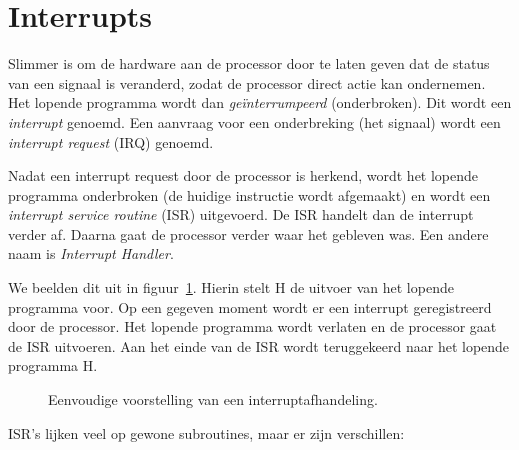 \section{Interrupts}
Slimmer is om de hardware aan de processor door te laten geven dat de status
van een signaal is veranderd, zodat de processor direct actie kan ondernemen.
Het lopende programma wordt dan \textsl{geïnterrumpeerd} (onderbroken).
Dit wordt een \textsl{interrupt} genoemd. Een aanvraag voor een onderbreking
(het signaal) wordt een \textsl{interrupt request} (IRQ) genoemd.

Nadat een interrupt request door de processor is herkend, wordt het lopende
programma onderbroken (de huidige instructie wordt afgemaakt) en wordt een
\textsl{interrupt service routine} (ISR) uitgevoerd. De ISR handelt dan de
interrupt verder af. Daarna gaat de processor verder waar het gebleven was.
Een andere naam is \textsl{Interrupt Handler}.

We beelden dit uit in figuur~\ref{fig:intsimpleinterruptdispatch}. Hierin
stelt \textsf{H} de uitvoer van het lopende programma voor. Op een gegeven
moment wordt er een interrupt geregistreerd door de processor. Het lopende
programma wordt verlaten en de processor gaat de ISR uitvoeren. Aan het einde
van de ISR wordt teruggekeerd naar het lopende programma \textsf{H}.


\begin{figure}[!ht]
\centering
{}
\caption{Eenvoudige voorstelling van een interruptafhandeling.}
\label{fig:intsimpleinterruptdispatch}
\end{figure}

ISR's lijken veel op gewone subroutines, maar er zijn verschillen:

